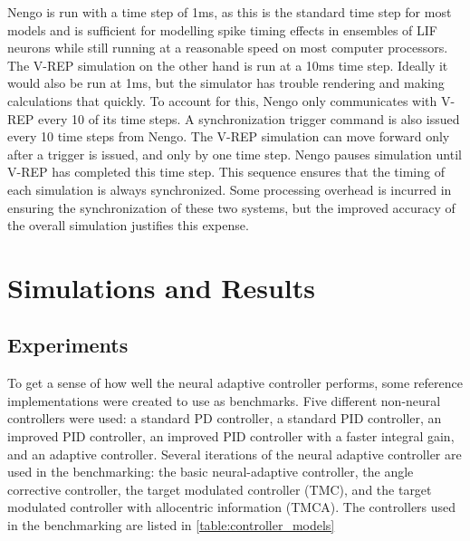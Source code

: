 \documentclass[letterpaper,12pt,titlepage,oneside,final]{book}
\begin{document}
Nengo is run with a time step of 1ms, as this is the standard time step for most models and is sufficient for modelling spike timing effects in ensembles of LIF neurons while still running at a reasonable speed on most computer processors. 
The V-REP simulation on the other hand is run at a 10ms time step. 
Ideally it would also be run at 1ms, but the simulator has trouble rendering and making calculations that quickly. 
To account for this, Nengo only communicates with V-REP every 10 of its time steps. 
A synchronization trigger command is also issued every 10 time steps from Nengo. 
The V-REP simulation can move forward only after a trigger is issued, and only by one time step. 
Nengo pauses simulation until V-REP has completed this time step. 
This sequence ensures that the timing of each simulation is always synchronized. 
Some processing overhead is incurred in ensuring the synchronization of these two systems, but the improved accuracy of the overall simulation justifies this expense. 

\chapter{Simulations and Results} \label{chap:analysis}

\section{Experiments}


To get a sense of how well the neural adaptive controller performs, some reference implementations were created to use as benchmarks. 
Five different non-neural controllers were used: a standard PD controller, a standard PID controller, an improved PID controller, an improved PID controller with a faster integral gain, and an adaptive controller. 
Several iterations of the neural adaptive controller are used in the benchmarking: the basic neural-adaptive controller, the angle corrective controller, the target modulated controller (TMC), and the target modulated controller with allocentric information (TMCA). %
The controllers used in the benchmarking are listed in \autoref{table:controller_models}
\end{document}
